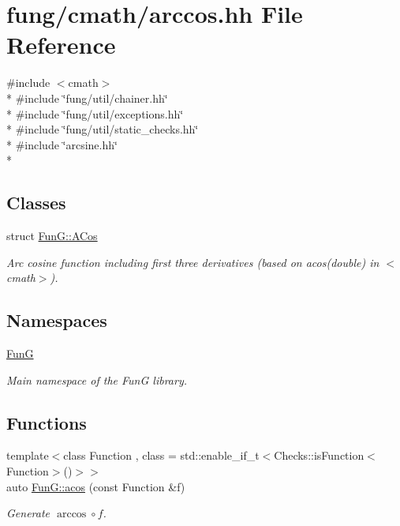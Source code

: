 \hypertarget{arccos_8hh}{\section{fung/cmath/arccos.hh File Reference}
\label{arccos_8hh}
}
{\ttfamily \#include $<$cmath$>$}\\*
{\ttfamily \#include \char`\"{}fung/util/chainer.\-hh\char`\"{}}\\*
{\ttfamily \#include \char`\"{}fung/util/exceptions.\-hh\char`\"{}}\\*
{\ttfamily \#include \char`\"{}fung/util/static\-\_\-checks.\-hh\char`\"{}}\\*
{\ttfamily \#include \char`\"{}arcsine.\-hh\char`\"{}}\\*
\subsection*{Classes}
\begin{DoxyCompactItemize}
\item 
struct \hyperlink{structFunG_1_1ACos}{Fun\-G\-::\-A\-Cos}
\begin{DoxyCompactList}\small\item\em Arc cosine function including first three derivatives (based on acos(double) in $<$cmath$>$). \end{DoxyCompactList}\end{DoxyCompactItemize}
\subsection*{Namespaces}
\begin{DoxyCompactItemize}
\item 
\hyperlink{namespaceFunG}{Fun\-G}
\begin{DoxyCompactList}\small\item\em Main namespace of the Fun\-G library. \end{DoxyCompactList}\end{DoxyCompactItemize}
\subsection*{Functions}
\begin{DoxyCompactItemize}
\item 
{\footnotesize template$<$class Function , class  = std\-::enable\-\_\-if\-\_\-t$<$\-Checks\-::is\-Function$<$\-Function$>$()$>$$>$ }\\auto \hyperlink{group__CMathGroup_gae9b7d3a479bcd8d48cf25f1c29edefb9}{Fun\-G\-::acos} (const Function \&f)
\begin{DoxyCompactList}\small\item\em Generate $ \arccos\circ f $. \end{DoxyCompactList}\end{DoxyCompactItemize}
